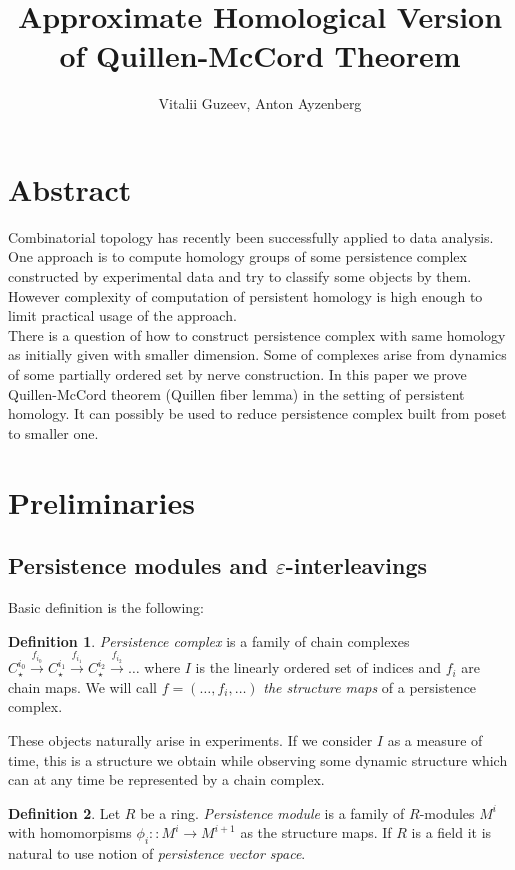 \documentclass[a4paper, 12pt]{article}
\title{Approximate Homological Version of Quillen-McCord Theorem}
\author{Vitalii Guzeev, Anton Ayzenberg}
\theoremstyle{definition}
\newtheorem{definition}{Definition}
\theoremstyle{remark}
\newcommand{\define}[1]{{\textit{#1}}}
\begin{document}
\section{Abstract}

Combinatorial topology has recently been successfully applied to data analysis. One approach is to compute homology groups of some persistence complex constructed by experimental data and try to classify some objects by them. However complexity of computation of persistent homology is high enough to limit practical usage of the approach.\\

There is a question of how to construct persistence complex with same homology as initially given with smaller dimension. Some of complexes arise from dynamics of some partially ordered set by nerve construction. In this paper we prove Quillen-McCord theorem (Quillen fiber lemma) in the setting of persistent homology. It can possibly be used to reduce persistence complex built from poset to smaller one.

\section{Preliminaries}

\subsection{Persistence modules and $\varepsilon$-interleavings}

Basic definition is the following:

\begin{definition}
  \define{Persistence complex} is a family of chain complexes $C_{\star}^{i_0} \xrightarrow{f_{i_0}} C_{\star}^{i_1} \xrightarrow{f_{i_1}} C_{\star}^{i_2} \xrightarrow{f_{i_2}} \ldots$ where $I$ is the linearly ordered set of indices and $f_i$ are chain maps. We will call $f=(\ldots,f_i,\ldots)$ \define{the structure maps} of a persistence complex.
\end{definition}

These objects naturally arise in experiments. If we consider $I$ as a measure of time, this is a structure we obtain while observing some dynamic structure which can at any time be represented by a chain complex.\\

\begin{definition}
  Let $R$ be a ring. \define{Persistence module} is a family of $R$-modules $M^i$ with homomorpisms $\phi_i :: M^i \to M^{i+1}$ as the structure maps. If $R$ is a field it is natural to use notion of \define{persistence vector space}.
\end{definition}
\end{document}
